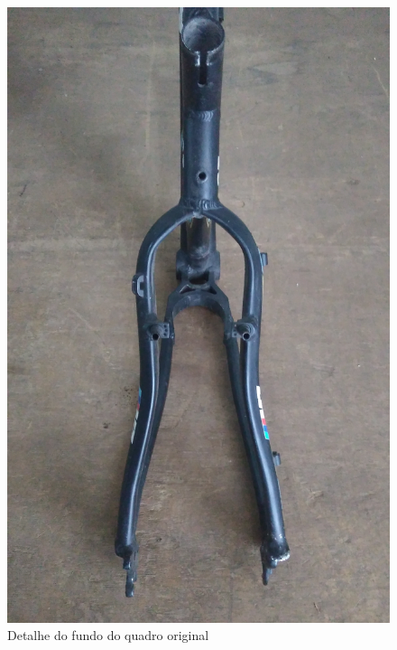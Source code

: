 	\graphicspath{{figuras/}}
	\begin{figure}[h!]
		\centering
		\includegraphics[scale=0.08]{quadro_original_fundo.jpg}
		\caption{Detalhe do fundo do quadro original}
		\label{img:quadro_original_fundo}
	\end{figure}
	
